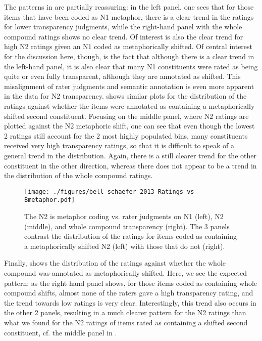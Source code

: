 The patterns in  are
partially reassuring: in the left panel, one sees that for those items
that have been coded as N1 metaphor, there is a clear trend in the
ratings for lower transparency judgments, while the right-hand panel
with the whole compound ratings shows no clear trend. Of interest is
also the clear trend for high N2 ratings given an N1 coded as
metaphorically shifted. Of central interest for the discussion here,
though, is the fact that although there is a clear trend in the
left-hand panel, it is also clear that many N1 constituents were rated
as being quite or even fully transparent, although they are annotated
as shifted. This misalignment of rater judgments and semantic
annotation is even more apparent in the data for N2
transparency. 
shows similar plots for the distribution of the ratings against
whether the items were annotated as containing a metaphorically
shifted second constituent. Focusing on the middle panel, where N2
ratings are plotted against the N2 metaphoric shift, one can see that
even though the lowest 2 ratings still account for the 2 most highly
populated bins, many constituents received very high transparency
ratings, so that it is difficult to speak of a general trend in the
distribution. 
Again, there is a still clearer trend for the other
constituent in the other direction, whereas there does not appear to
be a trend in the distribution of the whole compound ratings.



\begin{figure}[!htb]
  \centering
\texttt{[image: ./figures/bell-schaefer-2013\_Ratings-vs-Bmetaphor.pdf]}  
  \caption{The N2 is metaphor coding vs. rater judgments on N1 (left),
    N2 (middle),
    and whole compound transparency (right). The 3 panels contrast the
    distribution of the ratings for items coded as containing a
    metaphorically shifted N2 (left) with those that do not (right). }
  \label{fig:bell&schaefer2013_bmetaphor-ratings}
\end{figure}
\enlargethispage{1\baselineskip}
Finally,  shows the distribution
of the ratings against wheth\-er the whole compound was annotated
as metaphorically shifted. Here, we see the expected pattern: as the
right hand panel shows, for those items coded as containing whole
compound shifts, almost none of the raters gave a high transparency
rating, and the trend towards low ratings is very
clear. Interestingly, this trend also occurs in the other 2 panels,
resulting in a much clearer pattern for the N2 ratings than what we
found for the N2 ratings of items rated as containing a shifted second constituent, cf. the middle panel in .
 
